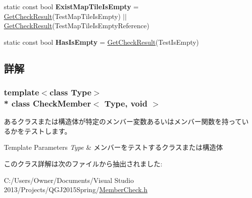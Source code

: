 \begin{DoxyCompactItemize}
\item 
static const bool {\bfseries Exist\+Map\+Tile\+Is\+Empty} = \hyperlink{_member_check_8h_a422ea6f7b3ccc3c32c0b5a735d39a842}{Get\+Check\+Result}(Test\+Map\+Tile\+Is\+Empty) $\vert$$\vert$ \hyperlink{_member_check_8h_a422ea6f7b3ccc3c32c0b5a735d39a842}{Get\+Check\+Result}(Test\+Map\+Tile\+Is\+Empty\+Reference)\hypertarget{class_check_member_3_01_type_00_01void_01_4_a9ddc29e865d8aabc8d20f3b952e344dc}{}\label{class_check_member_3_01_type_00_01void_01_4_a9ddc29e865d8aabc8d20f3b952e344dc}

\item 
static const bool {\bfseries Has\+Is\+Empty} = \hyperlink{_member_check_8h_a422ea6f7b3ccc3c32c0b5a735d39a842}{Get\+Check\+Result}(Test\+Is\+Empty)\hypertarget{class_check_member_3_01_type_00_01void_01_4_a9c5450e36a00609a13bb057e4bb657a9}{}\label{class_check_member_3_01_type_00_01void_01_4_a9c5450e36a00609a13bb057e4bb657a9}

\end{DoxyCompactItemize}


\subsection{詳解}
\subsubsection*{template$<$class Type$>$\\*
class Check\+Member$<$ Type, void $>$}

あるクラスまたは構造体が特定のメンバー変数あるいはメンバー関数を持っているかをテストします。 
\begin{DoxyTemplParams}{Template Parameters}
{\em Type} & メンバーをテストするクラスまたは構造体 \\
\hline
\end{DoxyTemplParams}


このクラス詳解は次のファイルから抽出されました\+:\begin{DoxyCompactItemize}
\item 
C\+:/\+Users/\+Owner/\+Documents/\+Visual Studio 2013/\+Projects/\+Q\+G\+J2015\+Spring/\hyperlink{_member_check_8h}{Member\+Check.\+h}\end{DoxyCompactItemize}
